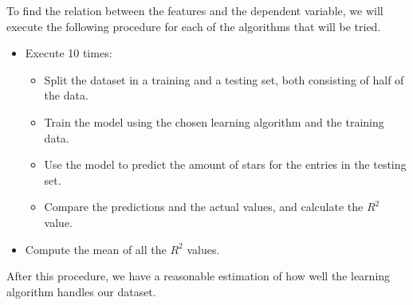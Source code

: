         To find the relation between the features and the dependent variable, we will execute the following procedure for each of the algorithms that will be tried.
        \begin{itemize}
            \item Execute 10 times:
                \begin{itemize}
                    \item Split the dataset in a training and a testing set, both consisting of half of the data.
                    \item Train the model using the chosen learning algorithm and the training data.
                    \item Use the model to predict the amount of stars for the entries in the testing set.
                    \item Compare the predictions and the actual values, and calculate the $R^2$ value.
                \end{itemize}
            \item Compute the mean of all the $R^2$ values.
        \end{itemize}
        
        After this procedure, we have a reasonable estimation of how well the learning algorithm handles our dataset.

